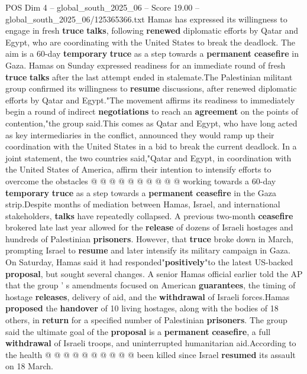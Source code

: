 \begin{textsample}{POS Dim 4 – global\_south\_2025\_06 – Score 19.00 – global\_south\_2025\_06/125365366.txt}  \label{ex:f4_pos_356}
Hamas has expressed its willingness to engage in fresh \textbf{truce} \textbf{talks}, following \textbf{renewed} diplomatic efforts by Qatar and Egypt, who are coordinating with the United States to break the deadlock.
The aim is a 60-day \textbf{temporary} \textbf{truce} as a step towards a \textbf{permanent} \textbf{ceasefire} in Gaza.
Hamas on Sunday expressed readiness for an immediate round of fresh \textbf{truce} \textbf{talks} after the last attempt ended in stalemate.The Palestinian militant group confirmed its willingness to \textbf{resume} discussions, after renewed diplomatic efforts by Qatar and Egypt."The movement affirms its readiness to immediately begin a round of indirect \textbf{negotiations} to reach an \textbf{agreement} on the points of contention,"the group said.This comes as Qatar and Egypt, who have long acted as key intermediaries in the conflict, announced they would ramp up their coordination with the United States in a bid to break the current deadlock.
In a joint statement, the two countries said,"Qatar and Egypt, in coordination with the United States of America, affirm their intention to intensify efforts to overcome the obstacles @ @ @ @ @ @ @ @ @ @ working towards a 60-day \textbf{temporary} \textbf{truce} as a step towards a \textbf{permanent} \textbf{ceasefire} in the Gaza strip.Despite months of mediation between Hamas, Israel, and international stakeholders, \textbf{talks} have repeatedly collapsed.
A previous two-month \textbf{ceasefire} brokered late last year allowed for the \textbf{release} of dozens of Israeli hostages and hundreds of Palestinian \textbf{prisoners}.
However, that \textbf{truce} broke down in March, prompting Israel to \textbf{resume} and later intensify its military campaign in Gaza.
On Saturday, Hamas said it had responded"\textbf{positively}"to the latest US-backed \textbf{proposal}, but sought several changes.
A senior Hamas official earlier told the AP that the group ' s amendments focused on American \textbf{guarantees}, the timing of hostage \textbf{releases}, delivery of aid, and the \textbf{withdrawal} of Israeli forces.Hamas \textbf{proposed} the \textbf{handover} of 10 living hostages, along with the bodies of 18 others, in \textbf{return} for a specified number of Palestinian \textbf{prisoners}.
The group said the ultimate goal of the \textbf{proposal} is a \textbf{permanent} \textbf{ceasefire}, a full \textbf{withdrawal} of Israeli troops, and uninterrupted humanitarian aid.According to the health @ @ @ @ @ @ @ @ @ @ been killed since Israel \textbf{resumed} its assault on 18 March.

\end{textsample}

